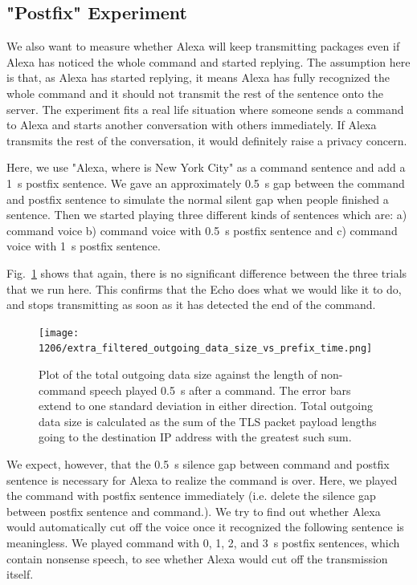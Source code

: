 \subsection{"Postfix" Experiment}
  
We also want to measure whether Alexa will keep transmitting packages even if Alexa has noticed the whole command and started replying. The assumption here is that, as Alexa has started replying, it means Alexa has fully recognized the whole command and it should not transmit the rest of the sentence onto the server. The experiment fits a real life situation where someone sends a command to Alexa and starts another conversation with others immediately. If Alexa transmits the rest of the conversation, it would definitely raise a privacy concern.

Here, we use "Alexa, where is New York City" as a command sentence and add a 1~s postfix sentence. We gave an approximately 0.5~s gap between the command and postfix sentence to simulate the normal silent gap when people finished a sentence. Then we started playing three different kinds of sentences which are: a) command voice b) command voice with 0.5~s postfix sentence and c) command voice with 1~s postfix sentence.

Fig.~\ref{fig:postfix_gap} shows that again, there is no significant difference between the three trials that we run here. This confirms that the Echo does what we would like it to do, and stops transmitting as soon as it has detected the end of the command.

\begin{figure}[]
    \centering
    \texttt{[image: 1206/extra\_filtered\_outgoing\_data\_size\_vs\_prefix\_time.png]}
    \caption{Plot of the total outgoing data size against the length of non-command speech played 0.5~s after a command. The error bars extend to one standard deviation in either direction. Total outgoing data size is calculated as the sum of the TLS packet payload lengths going to the destination IP address with the greatest such sum.}
    \label{fig:postfix_gap}
\end{figure}



We expect, however, that the 0.5~s silence gap between command and postfix sentence is necessary for Alexa to realize the command is over. Here, we played the command with postfix sentence immediately (i.e. delete the silence gap between postfix sentence and command.). We try to find out whether Alexa would automatically cut off the voice once it recognized the following sentence is meaningless. We played command with 0, 1, 2, and 3~s postfix sentences, which contain nonsense speech, to see whether Alexa would cut off the transmission itself.

